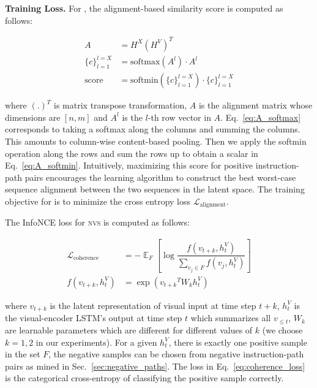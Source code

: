 \documentclass[10pt,twocolumn,letterpaper]{article}
\DeclareMathOperator*{\expect}{\mathbb{E}}
\newcommand{\tasknvs}{\textsc{nvs}}
\begin{document}
\textbf{Training Loss.}
For {\taskcma}, the alignment-based similarity score is computed as follows:

\begin{small}
\begin{align}
    A &= H^X({H^V})^T  \label{eq:A_compute} \\
    \{c\}_{l=1}^{l=X} &= \text{softmax}(A^l) \cdot A^l  \label{eq:A_softmax} \\
    \text{score} &= \text{softmin}(\{c\}_{l=1}^{l=X}) \cdot \{c\}_{l=1}^{l=X}  \label{eq:A_softmin}
\end{align}
\end{small}

\noindent
where $(.)^T$ is matrix transpose transformation, $A$ is the alignment matrix whose dimensions are $[n, m]$ and $A^l$ is the $l$-th row vector in $A$. Eq.~\ref{eq:A_softmax} corresponds to taking a softmax along the columns and summing the columns. This amounts to column-wise content-based pooling. Then we apply the softmin operation along the rows and sum the rows up to obtain a scalar in Eq.~\ref{eq:A_softmin}. Intuitively, maximizing this score for positive instruction-path pairs encourages the learning algorithm to construct the best worst-case sequence alignment between the two sequences in the latent space. The training objective for {\taskcma} is to minimize the cross entropy loss $\mathcal{L}_\text{alignment}$.

The InfoNCE \cite{Oord2018RepresentationLW} loss for {\tasknvs} is computed as follows:

\begin{small}
\begin{align}
    \mathcal{L}_\text{coherence} &= -\expect_F\left[\log \dfrac{f(v_{t+k}, h_t^V)}{\sum_{v_j \in F} f(v_j, h_t^V)}\right]  \label{eq:coherence_loss} \\
    f(v_{t+k}, h_t^V) &= \exp({v_{t+k}}^T W_k h_t^V)
\end{align}
\end{small}

\noindent
where $v_{t+k}$ is the latent representation of visual input at time step $t+k$, $h_t^V$ is the visual-encoder LSTM's output at time step $t$ which summarizes all $v_{\leq t}$, $W_k$ are learnable parameters which are different for different values of $k$ (we choose $k={1,2}$ in our experiments). For a given $h_t^V$, there is exactly one positive sample in the set $F$, the negative samples can be chosen from negative instruction-path pairs as mined in Sec.~\ref{sec:negative_paths}. The loss in Eq.~\ref{eq:coherence_loss} is the categorical cross-entropy of classifying the positive sample correctly.
\end{document}
